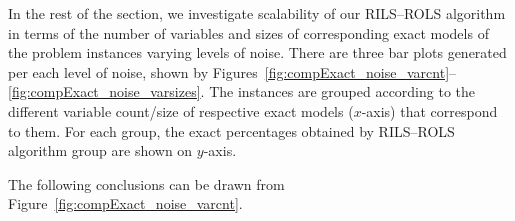 \documentclass{bmcart}
\begin{document}
\begin{center}
	\label{fig:compR2_noise_size}
\end{center}

In the rest of the section,  we investigate scalability of our \textsc{RILS}--\textsc{ROLS} algorithm in terms of the number of variables and sizes of corresponding exact models of the problem instances varying levels of noise. There are three bar plots generated per each level of noise, shown by Figures~\ref{fig:compExact_noise_varcnt}--\ref{fig:compExact_noise_varsizes}. The instances are grouped according to the different variable count/size of respective exact models ($x$-axis) that correspond to them. For each group, the exact percentages obtained by \textsc{RILS}--\textsc{ROLS} algorithm group are shown on $y$-axis.

The following conclusions can be drawn from Figure~\ref{fig:compExact_noise_varcnt}. 
\end{document}
